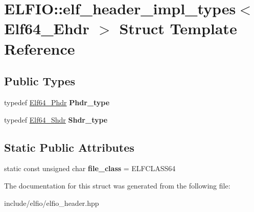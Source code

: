 \hypertarget{struct_e_l_f_i_o_1_1elf__header__impl__types_3_01_elf64___ehdr_01_4}{}\section{E\+L\+F\+IO\+:\+:elf\+\_\+header\+\_\+impl\+\_\+types$<$ Elf64\+\_\+\+Ehdr $>$ Struct Template Reference}
\label{struct_e_l_f_i_o_1_1elf__header__impl__types_3_01_elf64___ehdr_01_4}
\subsection*{Public Types}
\begin{DoxyCompactItemize}
\item 
typedef \hyperlink{struct_e_l_f_i_o_1_1_elf64___phdr}{Elf64\+\_\+\+Phdr} {\bfseries Phdr\+\_\+type}\hypertarget{struct_e_l_f_i_o_1_1elf__header__impl__types_3_01_elf64___ehdr_01_4_adb25fa9e29790704c42240aeeb47c3ae}{}\label{struct_e_l_f_i_o_1_1elf__header__impl__types_3_01_elf64___ehdr_01_4_adb25fa9e29790704c42240aeeb47c3ae}

\item 
typedef \hyperlink{struct_e_l_f_i_o_1_1_elf64___shdr}{Elf64\+\_\+\+Shdr} {\bfseries Shdr\+\_\+type}\hypertarget{struct_e_l_f_i_o_1_1elf__header__impl__types_3_01_elf64___ehdr_01_4_aa4b7b8e2f0ef6bdb750c0044ef8ec174}{}\label{struct_e_l_f_i_o_1_1elf__header__impl__types_3_01_elf64___ehdr_01_4_aa4b7b8e2f0ef6bdb750c0044ef8ec174}

\end{DoxyCompactItemize}
\subsection*{Static Public Attributes}
\begin{DoxyCompactItemize}
\item 
static const unsigned char {\bfseries file\+\_\+class} = E\+L\+F\+C\+L\+A\+S\+S64\hypertarget{struct_e_l_f_i_o_1_1elf__header__impl__types_3_01_elf64___ehdr_01_4_aeea4dcb067d1745cd80aa6e810adf214}{}\label{struct_e_l_f_i_o_1_1elf__header__impl__types_3_01_elf64___ehdr_01_4_aeea4dcb067d1745cd80aa6e810adf214}

\end{DoxyCompactItemize}


The documentation for this struct was generated from the following file\+:\begin{DoxyCompactItemize}
\item 
include/elfio/elfio\+\_\+header.\+hpp\end{DoxyCompactItemize}
